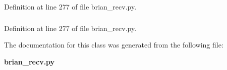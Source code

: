 \-Definition at line 277 of file brian\-\_\-recv.\-py.

\subsubsection[{weight}]{}\label{classbrian__recv_1_1CloseNeuron_abf67966d94b289d80dd0a934f7497974}


\-Definition at line 277 of file brian\-\_\-recv.\-py.



\-The documentation for this class was generated from the following file\-:\begin{DoxyCompactItemize}
\item 
{\bf brian\-\_\-recv.\-py}\end{DoxyCompactItemize}
